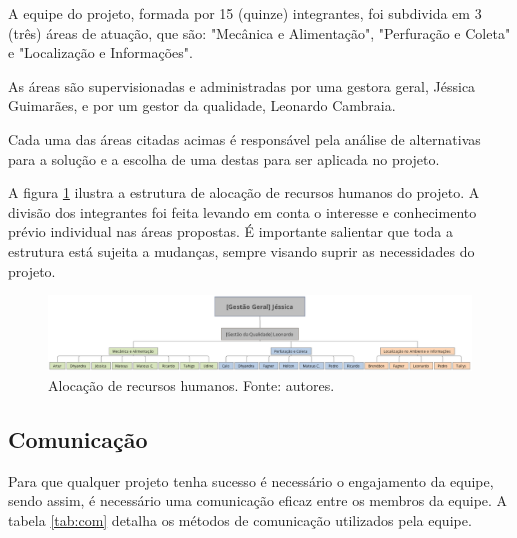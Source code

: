       A equipe do projeto, formada por 15 (quinze) integrantes, foi
      subdivida em 3 (três) áreas de atuação, que são: "Mecânica e Alimentação", "Perfuração e Coleta" e "Localização e Informações".

      As áreas são supervisionadas e administradas por uma gestora geral, Jéssica Guimarães,
      e por um gestor da qualidade, Leonardo Cambraia.

      Cada uma das áreas citadas acimas é responsável pela análise de alternativas
      para a solução e a escolha de uma destas para ser aplicada no projeto.

      A figura \ref{fig:aloc} ilustra a estrutura de alocação de recursos humanos do
      projeto. A divisão dos integrantes foi feita levando em conta o
      interesse e conhecimento prévio individual nas áreas propostas.
      É importante salientar que toda a estrutura está sujeita a mudanças, sempre
      visando suprir as necessidades do projeto.

      \begin{figure}[!htbp]
        \centering
        \includegraphics[width=\textwidth]{figuras/alocacao.eps}
        \caption{Alocação de recursos humanos. Fonte: autores.}
        \label{fig:aloc}
      \end{figure}

    \subsection{Comunicação}

      Para que qualquer projeto tenha sucesso é necessário o engajamento da equipe, sendo assim, é necessário uma comunicação eficaz entre os membros da equipe. A tabela \ref{tab:com} detalha os métodos de comunicação utilizados pela equipe.
      
